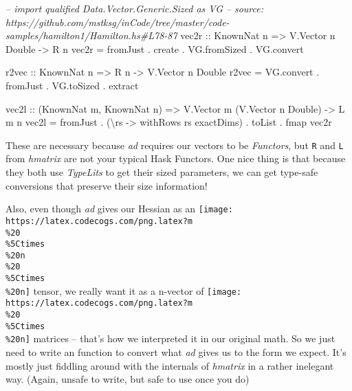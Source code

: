 \documentclass[]{article}
\newenvironment{Shaded}{}{}
\newcommand{\DataTypeTok}[1]{\textcolor[rgb]{0.56,0.13,0.00}{#1}}
\newcommand{\CommentTok}[1]{\textcolor[rgb]{0.38,0.63,0.69}{\textit{#1}}}
\newcommand{\OtherTok}[1]{\textcolor[rgb]{0.00,0.44,0.13}{#1}}
\newcommand{\FunctionTok}[1]{\textcolor[rgb]{0.02,0.16,0.49}{#1}}
\newcommand{\NormalTok}[1]{#1}
\begin{document}
\begin{Shaded}
\begin{Highlighting}[]
\CommentTok{-- import qualified Data.Vector.Generic.Sized as VG}
\CommentTok{-- source: https://github.com/mstksg/inCode/tree/master/code-samples/hamilton1/Hamilton.hs#L78-87}
\OtherTok{vec2r ::} \DataTypeTok{KnownNat}\NormalTok{ n }\OtherTok{=>} \DataTypeTok{V.Vector}\NormalTok{ n }\DataTypeTok{Double} \OtherTok{->} \DataTypeTok{R}\NormalTok{ n}
\NormalTok{vec2r }\FunctionTok{=}\NormalTok{ fromJust }\FunctionTok{.}\NormalTok{ create }\FunctionTok{.}\NormalTok{ VG.fromSized }\FunctionTok{.}\NormalTok{ VG.convert}

\OtherTok{r2vec ::} \DataTypeTok{KnownNat}\NormalTok{ n }\OtherTok{=>} \DataTypeTok{R}\NormalTok{ n }\OtherTok{->} \DataTypeTok{V.Vector}\NormalTok{ n }\DataTypeTok{Double}
\NormalTok{r2vec }\FunctionTok{=}\NormalTok{ VG.convert }\FunctionTok{.}\NormalTok{ fromJust }\FunctionTok{.}\NormalTok{ VG.toSized }\FunctionTok{.}\NormalTok{ extract}

\OtherTok{vec2l ::}\NormalTok{ (}\DataTypeTok{KnownNat}\NormalTok{ m, }\DataTypeTok{KnownNat}\NormalTok{ n) }\OtherTok{=>} \DataTypeTok{V.Vector}\NormalTok{ m (}\DataTypeTok{V.Vector}\NormalTok{ n }\DataTypeTok{Double}\NormalTok{) }\OtherTok{->} \DataTypeTok{L}\NormalTok{ m n}
\NormalTok{vec2l }\FunctionTok{=}\NormalTok{ fromJust }\FunctionTok{.}\NormalTok{ (\textbackslash{}rs }\OtherTok{->}\NormalTok{ withRows rs exactDims) }\FunctionTok{.}\NormalTok{ toList }\FunctionTok{.}\NormalTok{ fmap vec2r}
\end{Highlighting}
\end{Shaded}

These are necessary because \emph{ad} requires our vectors to be
\emph{Functors}, but \texttt{R} and \texttt{L} from \emph{hmatrix} are not your
typical Hask Functors. One nice thing is that because they both use
\emph{TypeLits} to get their sized parameters, we can get type-safe conversions
that preserve their size information!

Also, even though \emph{ad} gives our Hessian as an
\texttt{[image: https://latex.codecogs.com/png.latex?m\\\%20\\\%5Ctimes\\\%20n\\\%20\\\%5Ctimes\\\%20n]}
tensor, we really want it as a n-vector of
\texttt{[image: https://latex.codecogs.com/png.latex?m\\\%20\\\%5Ctimes\\\%20n]}
matrices -- that's how we interpreted it in our original math. So we just need
to write an function to convert what \emph{ad} gives us to the form we expect.
It's mostly just fiddling around with the internals of \emph{hmatrix} in a
rather inelegant way. (Again, unsafe to write, but safe to use once you do)
\end{document}
